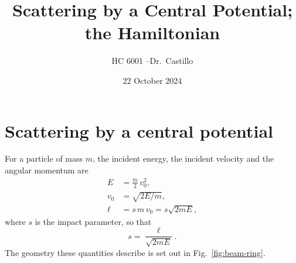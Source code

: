 \documentclass[11pt]{article}
\title{Scattering by a Central Potential;\\ the Hamiltonian}
\author{HC 6001 \quad--\quad Dr.\ Castillo}
\date{22 October 2024}
\begin{document}
\maketitle

\section{Scattering by a central potential}

For a particle of mass $m$, the incident energy, the incident velocity and the
angular momentum are
%
\begin{align}
  E    &= \frac{m}{2}\,v_0^{2}, \label{eq:E}\\
  v_0  &= \sqrt{2E/m}, \label{eq:v0}\\
  \ell &= s\,m\,v_0 = s\sqrt{2mE}, \label{eq:ell}
\end{align}
%
where $s$ is the impact parameter, so that
%
\begin{equation}\label{eq:s-of-ell}
  s = \frac{\ell}{\sqrt{2mE}}.
\end{equation}
%
The geometry these quantities describe is set out in Fig.~\ref{fig:beam-ring}.
\end{document}
